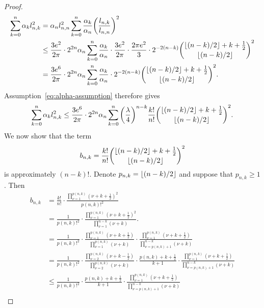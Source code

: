 \documentclass{mcom-l}
\numberwithin{equation}{section}
\numberwithin{theorem}{section} %
\DeclarePairedDelimiter{\floor}{\lfloor}{\rfloor}         %
\begin{document}
\begin{proof}
\begin{equation*}
\begin{split}
    \sum_{k=0}^n \alpha_k l_{n,k}^2 &= \alpha_n l_{n,n}^2 \sum_{k=0}^n \frac{\alpha_k}{\alpha_n} \bigg( \frac{l_{n,k}}{l_{n,n}} \bigg)^2 \\
    &\leq \frac{3e^2}{2\pi} \cdot 2^{2n} \alpha_n \sum_{k=0}^n \frac{\alpha_k}{\alpha_n} \cdot \frac{3e^2}{2\pi} \cdot \frac{2\pi e^2}{3} \cdot 2^{-2(n-k)} \binom{\floor{(n-k)/2} + k + \frac{1}{2}}{\floor{(n-k)/2}}^2 \\
    &= \frac{3e^6}{2\pi} \cdot 2^{2n} \alpha_n \sum_{k=0}^n \frac{\alpha_k}{\alpha_n} \cdot 2^{-2(n-k)} \binom{\floor{(n-k)/2} + k + \frac{1}{2}}{\floor{(n-k)/2}}^2.
    \end{split}
  \end{equation*}
  Assumption~\eqref{eq:alpha-assumption} therefore gives
  \begin{equation} \label{eq:s-l2-1}
    \sum_{k=0}^n \alpha_k l_{n,k}^2 \leq \frac{3e^6}{2\pi} \cdot 2^{2n} \alpha_n \sum_{k=0}^n \bigg( \frac{\lambda}{4} \bigg)^{n-k} \frac{k!}{n!} \binom{\floor{(n-k)/2} + k + \frac{1}{2}}{ \floor{(n-k)/2}}^2.
  \end{equation}
  We now show that the term
  \begin{equation*}
    b_{n, k} = \frac{k!}{n!} \binom{\floor{(n-k)/2} + k + \frac{1}{2}}{\floor{(n-k)/2}}^2
  \end{equation*}
  is approximately $(n - k)!$.
  Denote $p_{n,k} = \floor{(n-k)/2}$ and suppose that $p_{n,k} \geq 1$.
  Then
  \begin{align*}
      b_{n, k} &= \frac{k!}{n!} \cdot \frac{\prod_{\nu = 1}^{p(n,k)} (\nu + k + \frac{1}{2})^2}{p(n,k)!^2} \\
    &= \frac{1}{ p(n,k)!^2 } \cdot \frac{\prod_{\nu = 1}^{p(n,k)} (\nu + k + \frac{1}{2})^2}{\prod_{\nu=1}^{n-k} (\nu + k)}. \\
          &= \frac{1}{ p(n,k)!^2 } \cdot \frac{\prod_{\nu = 1}^{p(n,k)} (\nu + k + \frac{1}{2})}{\prod_{\nu=1}^{p(n,k)} (\nu + k)} \cdot \frac{\prod_{\nu = 1}^{p(n,k)} (\nu + k + \frac{1}{2})}{\prod_{\nu=p(n,k)+1}^{n-k} (\nu + k)} \\
    &= \frac{1}{ p(n,k)!^2 } \cdot \frac{\prod_{\nu = 2}^{p(n,k)} (\nu + k - \frac{1}{2})}{\prod_{\nu=2}^{p(n,k)} (\nu + k)} \cdot \frac{p(n,k) + k + \frac{1}{2}}{k + 1} \cdot \frac{\prod_{\nu = 1}^{p(n,k)} (\nu + k + \frac{1}{2})}{\prod_{\nu=p(n,k)+1}^{n-k} (\nu + k)} \\
      &\leq \frac{1}{ p(n,k)!^2 } \cdot \frac{p(n,k) + k + \frac{1}{2}}{k + 1} \cdot \frac{\prod_{\nu = 1}^{p(n,k)} (\nu + k + \frac{1}{2})}{\prod_{\nu=p(n,k)+1}^{n-k} (\nu + k)} \\

\end{align*}
\end{proof}
\end{document}
